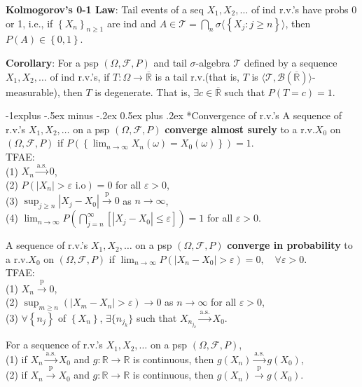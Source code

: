 \documentclass[paper=letter,fontsize=2.89mm]{scrartcl}
\makeatletter
\newcommand{\convprob}{\stackrel{\text{p}}{\longrightarrow}}
\newcommand{\convas}{\stackrel{\text{a.s.}}{\longrightarrow}}
\newcommand{\Borel}{\mathcal{B}}
\newcommand{\eps}{\varepsilon}
\newcommand{\R}{\mathbb{R}}
\newcommand\abs[1]{\left| #1 \right|}
\newcommand\set[1]{\left\{ #1 \right\}}
\renewcommand{\subsection}{\@startsection{subsection}{2}{0mm}%
                                {-1explus -.5ex minus -.2ex}%
                                {0.5ex plus .2ex}%
                                {\normalfont\normalsize\bfseries}}
\makeatother
\begin{document}
\begin{multicols*}{3}
\textbf{Kolmogorov's 0-1 Law}: Tail events of a seq $X_1, X_2, \dots$ of ind r.v.\@'s have probs 0 or 1, i.e., if $\set{X_n}_{n\ge1}$ are ind and $A \in \mathcal{T} = \bigcap_{n} \sigma \langle \set{X_j: j \ge n}\rangle$, then $P(A) \in \set{0,1}$. \\\medskip

\textbf{Corollary}: For a psp $(\Omega, \mathcal{F}, P)$ and tail $\sigma$-algebra $\mathcal{T}$ defined by a sequence $X_1, X_2, \dots$ of ind r.v.\@'s, if $T: \Omega \to \overline{\R}$ is a tail r.v.\@ (that is, $T$ is $\langle \mathcal{T}, \Borel(\overline{\R})\rangle$-measurable), then $T$ is degenerate. That is, $\exists c \in \overline{\R}$ such that $P(T = c) = 1$. \\\medskip

\subsection*{Convergence of r.v.\@'s}
A sequence of r.v.\@'s $X_1, X_2, \dots$ on a psp $(\Omega, \mathcal{F}, P)$ \textbf{converge almost surely} to a r.v.\@ $X_0$ on $(\Omega, \mathcal{F}, P)$ if
$P\left(\set{\lim_{n\to\infty} X_n(\omega) = X_0(\omega)}\right) = 1.$ \\ 
TFAE: \\
(1) $X_n \convas 0$, \\
(2) $P(\abs{X_n} > \eps \text{ i.o}) = 0$ for all $\eps > 0$, \\
(3) $\sup_{j\ge n} \abs{X_j - X_0} \convprob 0$ as $n\to\infty$, \\
(4) $\lim_{n\to\infty} P\left(\bigcap_{j=n}^\infty \left[ \abs{X_j - X_0} \le \eps\right]\right) = 1$ for all $\eps > 0$.  \\ \medskip

A sequence of r.v.\@'s $X_1, X_2, \dots$ on a psp $(\Omega, \mathcal{F}, P)$ \textbf{converge in probability} to a r.v.\@ $X_0$ on $(\Omega, \mathcal{F}, P)$ if
$\lim_{n\to\infty} P\left(\abs{X_n - X_0} > \eps\right) = 0, \quad \forall \eps > 0.$ \\ 
TFAE: \\
(1) $X_n \convprob 0$, \\
(2) $\sup_{m\ge n}\left( \abs{X_m - X_n} > \eps\right) \to 0$ as $n\to\infty$ for all $\eps > 0$, \\
(3) $\forall \set{n_j}$ of $\set{X_n}$,  $\exists \{n_{j_k}\}$ such that $X_{n_{j_k}} \convas X_0$. \\ \medskip

For a sequence of r.v.\@'s $X_1, X_2, \dots$ on a psp $(\Omega, \mathcal{F}, P)$, \\
(1) if $X_n \convas X_0$  and $g: \R \to \R$ is continuous, then $g(X_n) \convas g(X_0)$, \\
(2) if $X_n \convprob X_0$  and $g: \R \to \R$ is continuous, then $g(X_n) \convprob g(X_0)$. \\ \medskip


\end{multicols*}
\end{document}
